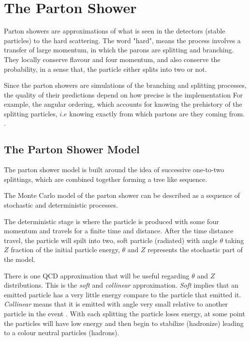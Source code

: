 \chapter{The Parton Shower}

Parton showers are approximations of what is seen in the detectors (stable particles) to the hard scattering. The word "hard", means the process involves a transfer of large momentum, in which the parons are splitting and branching.  
They locally conserve flavour and four momentum, and also conserve the probability, in a sense that, the particle either splits into two or not. 
 
Since the parton showers are simulations of the branching and splitting processes, the quality of their predictions depend on how precise is the implementation For example, the angular ordering, which accounts for knowing the prehistory of the splitting particles, $i.e$ knowing exactly from which partons are they coming from. \citep{introduction}. 

\section{The Parton Shower Model}
The parton shower model is built around the idea of successive one-to-two splittings, which are combined together forming a tree like sequence. 

The Monte Carlo model of the parton shower can be described as a sequence of stochastic and deterministic processes. 

The deterministic stage is where the particle is produced with some four momentum and travels for a finite time and distance.
After the time distance travel, the particle will spilt into two, soft particle (radiated) with angle $\theta$ taking $Z$ fraction of the initial particle energy, $\theta$ and $Z$ represents the stochastic part of the model. 
 
There is one QCD approximation that will be useful regarding $\theta$ and $Z$ distributions. This is the \textit{soft} and \textit{collinear} approximation. \textit{Soft} implies that an emitted particle has a very little energy compare to the particle that emitted it. \textit{Collinear} means that it is emitted with angle very small relative to another particle in the event \citep{Salam:2010zt}. With each splitting the particle loses energy, at some point the particles will have low energy and then begin to stabilize (hadronize) leading to a colour neutral particles (hadrons).          

